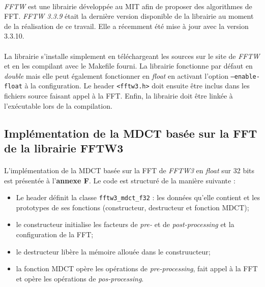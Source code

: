 \documentclass{article}
\begin{document}
    \paragraph{}
    \emph{FFTW} est une librairie développée au MIT afin de proposer des algorithmes de FFT\cite{FFTW05}. \emph{FFTW 3.3.9} était la dernière version disponible de la librairie au moment de la réalisation de ce travail. Elle a récemment été mise à jour avec la version 3.3.10.

    \paragraph{}
    La librairie s'installe simplement en téléchargeant les sources sur le site de \emph{FFTW}\cite{fftw} et en les compilant avec le Makefile fourni. La librairie fonctionne par défaut en \emph{double} mais elle peut également fonctionner en \emph{float} en activant l'option \texttt{--enable-float} à la configuration. Le header \texttt{<fftw3.h>} doit ensuite être inclus dans les fichiers source faisant appel à la FFT. Enfin, la librairie doit être linkée à l'exécutable lors de la compilation.


    \subsection{Implémentation de la MDCT basée sur la FFT de la librairie FFTW3}

    \paragraph{}
    L'implémentation de la MDCT basée sur la FFT de \emph{FFTW3} en \emph{float} sur 32 bits est présentée à l'\textbf{annexe F}. Le code est structuré de la manière suivante :
    \begin{itemize}
        \item Le header définit la classe \texttt{fftw3\_mdct\_f32} : les données qu'elle contient et les prototypes de ses fonctions (constructeur, destructeur et fonction MDCT);
        \item le constructeur initialise les facteurs de \emph{pre-} et de \emph{post-processing} et la configuration de la FFT;
        \item le destructeur libère la mémoire allouée dans le construucteur;
        \item la fonction MDCT opère les opérations de \emph{pre-processing}, fait appel à la FFT et opère les opérations de \emph{pos-processing}.
    \end{itemize}
\end{document}
